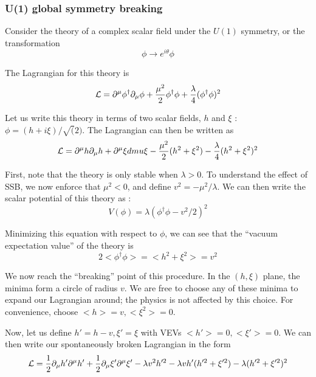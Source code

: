 \subsubsection{U(1) global symmetry breaking}

Consider the theory of a complex scalar field under the $U(1)$ symmetry, or the transformation
\begin{equation}
\phi \rightarrow e^{i\theta} \phi
\end{equation}

The Lagrangian for this theory is
\begin{equation}
\mathcal{L} = \partial^\mu \phi^{\dag} \partial_\mu \phi + \frac{\mu^2}{2} \phi^{\dag} \phi + \frac{\lambda}{4} (\phi^\dag \phi)^2
\end{equation}

Let us write this theory in terms of two scalar fields, $h$ and $\xi$ : $\phi = (h + i\xi) / \sqrt(2)$.
The Lagrangian can then be written as
\begin{equation}
\mathcal{L} = \partial^\mu h \partial_\mu h + \partial^\mu \xi dmu \xi - \frac{\mu^2}{2} (h^2 + \xi^2) - \frac{\lambda}{4}(h^2 + \xi^2)^2
\end{equation}

First, note that the theory is only stable when $\lambda > 0$.
To understand the effect of SSB, we now enforce that $\mu^2 < 0$, and define $v^2 = -\mu^2/\lambda$.
We can then write the scalar potential of this theory as :
\begin{equation}
V(\phi) = \lambda (\phi^\dag \phi - v^2/2)^2
\end{equation}

Minimizing this equation with respect to $\phi$, we can see that the ``vacuum expectation value'' of the theory is
\begin{equation}
2<\phi^\dag \phi> = <h^2 + \xi^2 > = v^2
\end{equation}

We now reach the ``breaking'' point of this procedure.
In the $(h, \xi)$ plane, the minima form a circle of radius $v$.
We are free to choose any of these minima to expand our Lagrangian around; the physics is not affected by this choice.
For convenience, choose $<h> = v, <\xi^2> = 0$.

Now, let us define $h' = h - v , \xi' = \xi $ with VEVs $<h'> = 0 , <\xi'> = 0$.
We can then write our spontaneously broken Lagrangian in the form
\begin{equation}
\mathcal{L} = \frac{1}{2} \partial_\mu h' \partial^\mu h' +  \frac{1}{2} \partial_\mu \xi' \partial^\mu \xi' - \lambda v^2 h'^2 - \lambda v h' (h'^2 + \xi'^2 ) - \lambda (h'^2 + \xi'^2)^2
\end{equation}


